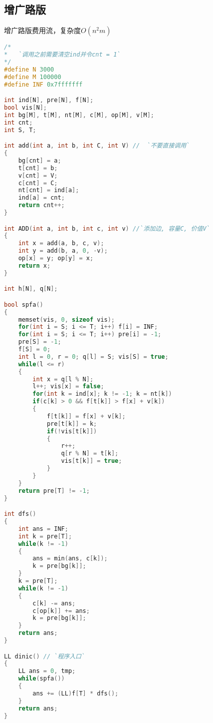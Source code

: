 ﻿\subsection{增广路版}
	增广路版费用流，复杂度$ O(n^{2}m) $
    \begin{lstlisting}[language=C++]
/*
*	`调用之前需要清空ind并令cnt = 1`
*/
#define N 3000
#define M 100000
#define INF 0x7fffffff

int ind[N], pre[N], f[N];
bool vis[N];
int bg[M], t[M], nt[M], c[M], op[M], v[M];
int cnt;
int S, T;

int add(int a, int b, int C, int V) //	`不要直接调用`
{
    bg[cnt] = a;
    t[cnt] = b;
    v[cnt] = V;
    c[cnt] = C;
    nt[cnt] = ind[a];
    ind[a] = cnt;
    return cnt++;
}

int ADD(int a, int b, int c, int v) //`添加边, 容量C, 价值V`
{
    int x = add(a, b, c, v);
    int y = add(b, a, 0, -v);
    op[x] = y; op[y] = x;
    return x;
}

int h[N], q[N];

bool spfa()
{
    memset(vis, 0, sizeof vis);
    for(int i = S; i <= T; i++) f[i] = INF;
    for(int i = S; i <= T; i++) pre[i] = -1;
    pre[S] = -1;
    f[S] = 0;
    int l = 0, r = 0; q[l] = S; vis[S] = true;
    while(l <= r)
    {
        int x = q[l % N];
        l++; vis[x] = false;
        for(int k = ind[x]; k != -1; k = nt[k])
        if(c[k] > 0 && f[t[k]] > f[x] + v[k])
        {
            f[t[k]] = f[x] + v[k];
            pre[t[k]] = k;
            if(!vis[t[k]])
            {
                r++;
                q[r % N] = t[k];
                vis[t[k]] = true;
            }
        }
    }
    return pre[T] != -1;
}

int dfs()
{
    int ans = INF;
    int k = pre[T];
    while(k != -1)
    {
        ans = min(ans, c[k]);
        k = pre[bg[k]];
    }
    k = pre[T];
    while(k != -1)
    {
        c[k] -= ans;
        c[op[k]] += ans;
        k = pre[bg[k]];
    }
    return ans;
}

LL dinic() // `程序入口`
{
    LL ans = 0, tmp;
    while(spfa())
    {
        ans += (LL)f[T] * dfs();
    }
    return ans;
}

\end{lstlisting}
